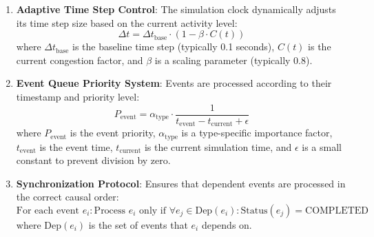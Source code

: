 \documentclass[12pt,a4paper]{article}
\begin{document}
\begin{enumerate}
    \item \textbf{Adaptive Time Step Control}: The simulation clock dynamically adjusts its time step size based on the current activity level:
    \begin{equation}
    \Delta t = \Delta t_{\text{base}} \cdot \left(1 - \beta \cdot C(t)\right)
    \end{equation}
    where $\Delta t_{\text{base}}$ is the baseline time step (typically 0.1 seconds), $C(t)$ is the current congestion factor, and $\beta$ is a scaling parameter (typically 0.8).
    
    \item \textbf{Event Queue Priority System}: Events are processed according to their timestamp and priority level:
    \begin{equation}
    P_{\text{event}} = \alpha_{\text{type}} \cdot \frac{1}{t_{\text{event}} - t_{\text{current}} + \epsilon}
    \end{equation}
    where $P_{\text{event}}$ is the event priority, $\alpha_{\text{type}}$ is a type-specific importance factor, $t_{\text{event}}$ is the event time, $t_{\text{current}}$ is the current simulation time, and $\epsilon$ is a small constant to prevent division by zero.
    
    \item \textbf{Synchronization Protocol}: Ensures that dependent events are processed in the correct causal order:
    \begin{equation}
    \text{For each event } e_i: \text{Process } e_i \text{ only if } \forall e_j \in \text{Dep}(e_i): \text{Status}(e_j) = \text{COMPLETED}
    \end{equation}
    where $\text{Dep}(e_i)$ is the set of events that $e_i$ depends on.
\end{enumerate}
\end{document}
